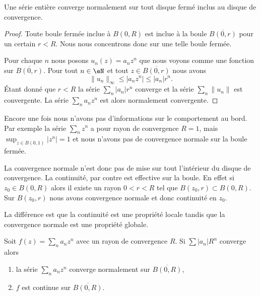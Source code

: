 \begin{theorem}
    Une série entière converge normalement sur tout disque fermé inclus au disque de convergence.
\end{theorem}

\begin{proof}
    Toute boule fermée inclue à \( B(0,R)\) est inclue à la boule \( \overline{ B(0,r) }\) pour un certain \( r<R\). Nous nous concentrons donc sur une telle boule fermée.

    Pour chaque \( n\) nous posons \( u_n(z)=a_nz^n\) que nous voyons comme une fonction sur \( \overline{ B(0,r) }\). Pour tout \( n\in \eN\) et tout \( z\in\overline{ B(0,r) }\) nous avons
    \begin{equation}
        \| u_n \|_{\infty}\leq| a_nz^n |\leq | a_n |r^n.
    \end{equation}
    Étant donné que \( r<R\) la série \( \sum_n | a_n |r^n\) converge et la série \( \sum_n\| u_n \|\) est convergente. La série \( \sum_na_nz^n\) est alors normalement convergente.
\end{proof}

\begin{example}
    Encore une fois nous n'avons pas d'informations sur le comportement au bord. Par exemple la série \( \sum_nz^n\) a pour rayon de convergence \( R=1\), mais \( \sup_{z\in B(0,1)}| z^n |=1\) et nous n'avons pas de convergence normale sur la boule fermée.
\end{example}

La convergence normale n'est donc pas de mise sur tout l'intérieur du disque de convergence. La continuité, par contre est effective sur la boule. En effet si \( z_0\in B(0,R)\) alors il existe un rayon \( 0<r<R\) tel que \( B(z_0,r)\subset B(0,R)\). Sur \( B(z_0,r)\) nous avons convergence normale et donc continuité en \( z_0\).

La différence est que la continuité est une propriété locale tandis que la convergence normale est une propriété globale.

\begin{proposition}
    Soit \( f(z)=\sum_na_nz^n\) avec un rayon de convergence \( R\). Si \( \sum | a_n |R^n\) converge alors
    \begin{enumerate}
        \item
            la série \( \sum_na_nz^n\) converge normalement sur \( \overline{ B(0,R) }\),
        \item
            \( f\) est continue sur \( \overline{ B(0,R) }\).
    \end{enumerate}
\end{proposition}

